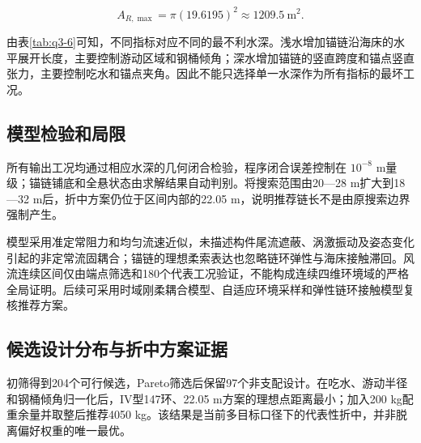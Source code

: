 \documentclass[UTF8,zihao=-4,a4paper,fontset=fandol]{ctexart}
\begin{document}
\[
A_{R,\max}=\pi(19.6195)^2
\approx1209.5\ \mathrm{m^2}.
\]
\begin{table}[H]\centering\small
\caption{推荐方案的最坏工况及约束校核}
\label{tab:q3-6}
\end{table}
由表\ref{tab:q3-6}可知，不同指标对应不同的最不利水深。浅水增加锚链沿海床的水平展开长度，主要控制游动区域和钢桶倾角；深水增加锚链的竖直跨度和锚点竖直张力，主要控制吃水和锚点夹角。因此不能只选择单一水深作为所有指标的最坏工况。

\subsection{模型检验和局限}
所有输出工况均通过相应水深的几何闭合检验，程序闭合误差控制在 \(10^{-8}\) m量级；锚链铺底和全悬状态由求解结果自动判别。将搜索范围由20—28 m扩大到18—32 m后，折中方案仍位于区间内部的22.05 m，说明推荐链长不是由原搜索边界强制产生。

模型采用准定常阻力和均匀流速近似，未描述构件尾流遮蔽、涡激振动及姿态变化引起的非定常流固耦合；锚链的理想柔索表达也忽略链环弹性与海床接触滞回。风流连续区间仅由端点筛选和180个代表工况验证，不能构成连续四维环境域的严格全局证明。后续可采用时域刚柔耦合模型、自适应环境采样和弹性链环接触模型复核推荐方案。

\subsection{候选设计分布与折中方案证据}
初筛得到204个可行候选，Pareto筛选后保留97个非支配设计。在吃水、游动半径和钢桶倾角归一化后，IV型147环、22.05 m方案的理想点距离最小；加入200 kg配重余量并取整后推荐4050 kg。该结果是当前多目标口径下的代表性折中，并非脱离偏好权重的唯一最优。
\end{document}
